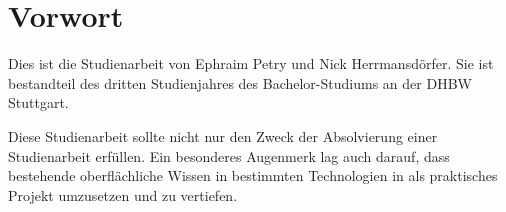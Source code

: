 \chapter*{Vorwort}
Dies ist die Studienarbeit von Ephraim Petry und Nick Herrmansdörfer. Sie ist bestandteil des
dritten Studienjahres des Bachelor-Studiums an der \gls{DHBW} Stuttgart.

Diese Studienarbeit sollte nicht nur den Zweck der Absolvierung einer Studienarbeit erfüllen. Ein
besonderes Augenmerk lag auch darauf, dass bestehende oberflächliche Wissen in bestimmten
Technologien in als praktisches Projekt umzusetzen und zu vertiefen.
